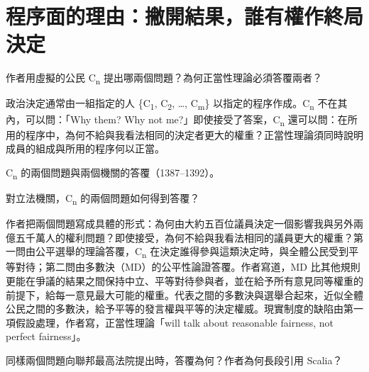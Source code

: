 \chapter{程序面的理由：撇開結果，誰有權作終局決定}


\begin{qaquestion}
作者用虛擬的公民 C\textsubscript{n} 提出哪兩個問題？為何正當性理論必須答覆兩者？
\end{qaquestion}

政治決定通常由一組指定的人 \{C\textsubscript{1}, C\textsubscript{2}, \ldots, C\textsubscript{m}\} 以指定的程序作成。C\textsubscript{n} 不在其內，可以問：「Why them? Why not me?」即使接受了答案，C\textsubscript{n} 還可以問：在所用的程序中，為何不給與我看法相同的決定者更大的權重？正當性理論須同時說明成員的組成與所用的程序何以正當。

\begin{qafigure}{C\textsubscript{n} 的兩個問題與兩個機關的答覆（1387--1392）。\label{fig:cn}}

\end{qafigure}


\begin{qaquestion}
對立法機關，C\textsubscript{n} 的兩個問題如何得到答覆？
\end{qaquestion}

作者把兩個問題寫成具體的形式：為何由大約五百位議員決定一個影響我與另外兩億五千萬人的權利問題？即使接受，為何不給與我看法相同的議員更大的權重？第一問由公平選舉的理論答覆，C\textsubscript{n} 在決定誰得參與這類決定時，與全體公民受到平等對待；第二問由多數決（MD）的公平性論證答覆。作者寫道，MD 比其他規則更能在爭議的結果之間保持中立、平等對待參與者，並在給予所有意見同等權重的前提下，給每一意見最大可能的權重。代表之間的多數決與選舉合起來，近似全體公民之間的多數決，給予平等的發言權與平等的決定權威。現實制度的缺陷由第一項假設處理，作者寫，正當性理論「will talk about reasonable fairness, not perfect fairness」。


\begin{qaquestion}
同樣兩個問題向聯邦最高法院提出時，答覆為何？作者為何長段引用 Scalia？
\end{qaquestion}

